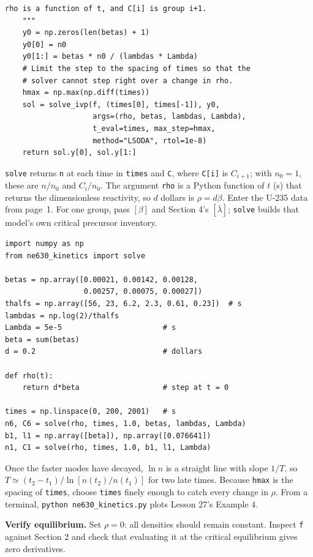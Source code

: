 \documentclass[compact]{ne630handout}
\begin{document}
\begin{handoutflow}
\begin{lstlisting}[style=NEpython]
    rho is a function of t, and C[i] is group i+1.
    """
    y0 = np.zeros(len(betas) + 1)
    y0[0] = n0
    y0[1:] = betas * n0 / (lambdas * Lambda)
    # Limit the step to the spacing of times so that the
    # solver cannot step right over a change in rho.
    hmax = np.max(np.diff(times))
    sol = solve_ivp(f, (times[0], times[-1]), y0,
                    args=(rho, betas, lambdas, Lambda),
                    t_eval=times, max_step=hmax,
                    method="LSODA", rtol=1e-8)
    return sol.y[0], sol.y[1:]
\end{lstlisting}

\columnbreak

\texttt{solve} returns \texttt{n} at each time in \texttt{times} and
\texttt{C}, where \texttt{C[i]} is $C_{i+1}$; with $n_0=1$, these are
$n/n_0$ and $C_i/n_0$. The argument \texttt{rho} is a Python function
of $t$ (s) that returns the dimensionless reactivity, so $d$ dollars
is $\rho=d\beta$. Enter the U-235 data from page~1.
For one group, pass $[\beta]$ and Section 4's $[\bar\lambda]$;
\texttt{solve} builds that model's own critical precursor inventory.

\begin{lstlisting}[style=NEpython]
import numpy as np
from ne630_kinetics import solve

betas = np.array([0.00021, 0.00142, 0.00128,
                  0.00257, 0.00075, 0.00027])
thalfs = np.array([56, 23, 6.2, 2.3, 0.61, 0.23])  # s
lambdas = np.log(2)/thalfs
Lambda = 5e-5                       # s
beta = sum(betas)
d = 0.2                             # dollars

def rho(t):
    return d*beta                   # step at t = 0

times = np.linspace(0, 200, 2001)   # s
n6, C6 = solve(rho, times, 1.0, betas, lambdas, Lambda)
b1, l1 = np.array([beta]), np.array([0.076641])
n1, C1 = solve(rho, times, 1.0, b1, l1, Lambda)
\end{lstlisting}

Once the faster modes have decayed, $\ln n$ is a straight line with
slope $1/T$, so $T\simeq(t_2-t_1)/\ln[n(t_2)/n(t_1)]$ for two late times.
Because \texttt{hmax} is the spacing of \texttt{times}, choose
\texttt{times} finely enough to catch every change in $\rho$.
From a terminal, \mbox{\texttt{python ne630\_kinetics.py}} plots
Lesson 27's Example 4.


\textbf{Verify equilibrium.} Set $\rho=0$: all densities should remain
constant. Inspect \texttt{f} against Section 2 and check that evaluating
it at the critical equilibrium gives zero derivatives.


\end{handoutflow}
\end{document}
